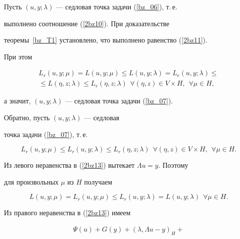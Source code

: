 \begin{pf}


Пусть $(u, y; \lambda)$ --- седловая точка задачи (\ref{bz_06}), т.\,е.


выполнено соотношение (\ref{2bz10}). При доказательстве 


теоремы~\ref{bz_T1} установлено, что выполнено равенство (\ref{2bz11}). 


При этом


\begin{multline*}


L_r (u,y;\mu)=L (u, y; \mu)\leq L (u, y;\lambda)=L_r (u, y; \lambda) \leq \\


%


\leq L (\eta, z; \lambda) \leq L_r (\eta, z; \lambda) 


\ \ \forall (\eta , z) \in V \times H, \ \ \forall \mu \in H,


\end{multline*}


а значит, $(u, y; \lambda)$ --- седловая точка задачи (\ref{bz_07}).





Обратно, пусть $(u, y; \lambda)$ --- седловая 


точка задачи (\ref{bz_07}), т.\,е.


\begin{equation}


L_r (u, y; \mu) \leq L_r (u, y; \lambda)


\leq L_r (\eta, z; \lambda)


\ \ \forall (\eta , z) \in V \times H, \ \ \forall \mu \in H.


\label{2bz13}


\end{equation}


Из левого неравенства в (\ref{2bz13}) вытекает $\Lambda u=y$. Поэтому


для произвольных $\mu$ из $H$ получаем


$$


L (u, y; \mu)=L_r (u, y; \mu) \leq L_r (u, y; \lambda)=L (u, y; \lambda)


\ \ \forall \mu \in H. 


$$


Из правого неравенства в (\ref{2bz13}) имеем


\begin{multline}


\Psi (u)+G(y)+(\lambda , \Lambda u-y)_H+



\end{multline}
\end{pf}
